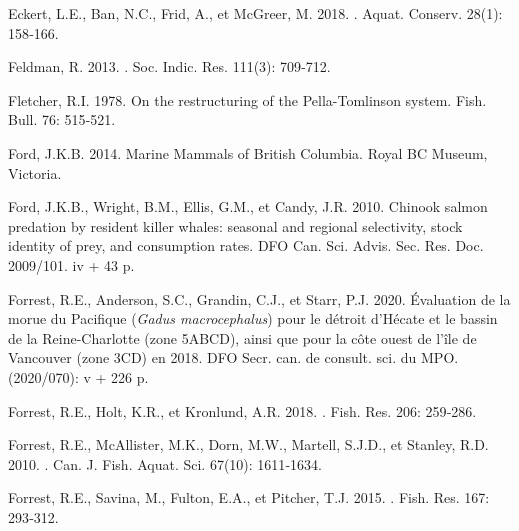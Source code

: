\documentclass[french,11pt]{book}
\begin{document}
\begin{CSLReferences}{1}{0}
%
Eckert, L.E., Ban, N.C., Frid, A., et McGreer, M. 2018. . Aquat. Conserv. 28(1): 158‑166.

%
Feldman, R. 2013. . Soc. Indic. Res. 111(3): 709‑712.

%
Fletcher, R.I. 1978. On the restructuring of the {Pella-Tomlinson} system. Fish. Bull. 76: 515‑521.

%
Ford, J.K.B. 2014. {Marine Mammals of British Columbia}. {Royal BC Museum}, Victoria.

%
Ford, J.K.B., Wright, B.M., Ellis, G.M., et Candy, J.R. 2010. Chinook salmon predation by resident killer whales: seasonal and regional selectivity, stock identity of prey, and consumption rates. DFO Can. Sci. Advis. Sec. Res. Doc. 2009/101. iv + 43 p.

%
Forrest, R.E., Anderson, S.C., Grandin, C.J., et Starr, P.J. 2020. Évaluation de la morue du {Pacifique} ({\emph{Gadus macrocephalus}}) pour le détroit d'{Hécate} et le bassin de la {Reine-Charlotte} (zone 5ABCD), ainsi que pour la côte ouest de l'île de {Vancouver} (zone 3CD) en 2018. DFO Secr. can. de consult. sci. du MPO. (2020/070): v + 226 p.

%
Forrest, R.E., Holt, K.R., et Kronlund, A.R. 2018. . Fish. Res. 206: 259‑286.

%
Forrest, R.E., McAllister, M.K., Dorn, M.W., Martell, S.J.D., et Stanley, R.D. 2010. . Can. J. Fish. Aquat. Sci. 67(10): 1611‑1634.

%
Forrest, R.E., Savina, M., Fulton, E.A., et Pitcher, T.J. 2015. . Fish. Res. 167: 293‑312.


\end{CSLReferences}
\end{document}
